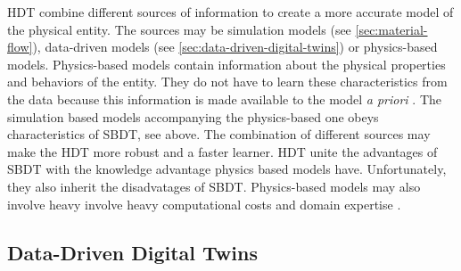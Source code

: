 HDT combine different sources of information to create a more accurate model of the physical entity. The sources may be simulation models (see \autoref{sec:material-flow}), data-driven models (see \autoref{sec:data-driven-digital-twins}) or physics-based models. Physics-based models contain information about the physical properties and behaviors of the entity. They do not have to learn these characteristics from the data because this information is made available to the model \textit{a priori} \autocite{kapteyn2022data,aivaliotis2019methodology}. The simulation based models accompanying the physics-based one obeys characteristics of SBDT, see above. The combination of different sources may make the HDT more robust and a faster learner. HDT unite the advantages of SBDT with the knowledge advantage physics based models have. Unfortunately, they also inherit the disadvatages of SBDT. Physics-based models may also involve heavy involve heavy computational costs and domain expertise \autocite{kapteyn2022data}.

\subsection{Data-Driven Digital Twins}
\label{sec:data-driven-digital-twins}

